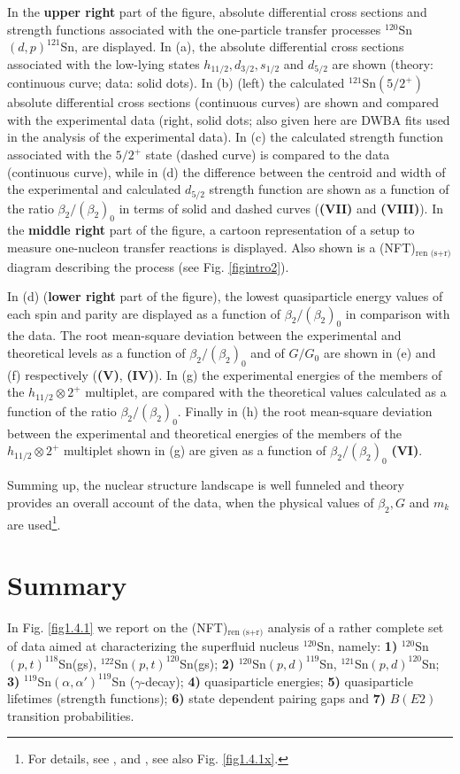    In the  \textbf{upper right} part of the figure, absolute differential cross sections and strength functions associated with the one-particle transfer processes $^{120}$Sn$(d,p)^{121}$Sn, are displayed. In  (a), the absolute differential cross sections associated with the low-lying  states $h_{11/2},d_{3/2},s_{1/2}$ and $d_{5/2}$ are shown (theory: continuous curve; data: solid dots). In (b) (left) the calculated $^{121}$Sn$(5/2^+)$ absolute differential cross sections (continuous curves) are shown and compared with the experimental data (right, solid dots; also given here are DWBA fits used in the analysis of the experimental data). In (c)  the calculated strength function associated with the $5/2^+$ state (dashed curve) is compared to the data (continuous curve), while in  (d) the difference between the centroid and  width of the experimental and calculated $d_{5/2}$ strength function  are shown as a function of the ratio $\beta_2/(\beta_2)_0$ in terms of  solid and dashed curves (\textbf{(VII)} and \textbf{(VIII)}).
    In the \textbf{middle right} part of the figure, a cartoon representation of a setup to measure one-nucleon transfer reactions is displayed. Also shown is a (NFT)$_{\text{ren (s+r)}}$ diagram  describing the process (see Fig. \ref{figintro2}).
    
    
      In (d)  (\textbf{lower right} part of the figure), the lowest quasiparticle energy values of each spin and parity are displayed as a function of $\beta_2/(\beta_2)_0$ in comparison with the data.  The root mean-square deviation between the experimental and theoretical levels as a function  of  $\beta_2/(\beta_2)_0$ and  of $G/G_0$ are shown in (e) and (f) respectively (\textbf{(V)}, \textbf{(IV)}). In (g) the  experimental energies of the members of the $h_{11/2}\otimes 2^+$  multiplet, are compared with the theoretical values calculated as a function of the ratio $\beta_2/(\beta_2)_0$. Finally in (h) the root mean-square deviation between the experimental and theoretical energies of the members of the $h_{11/2}\otimes 2^+$ multiplet shown in (g) are given as a function of $\beta_2/(\beta_2)_0$ \textbf{(VI)}. 
  
  
  Summing up, the nuclear structure landscape is well funneled and  theory provides an overall account of the data, when the physical values of $\beta_2,G$ and $m_k$ are used\footnote{For details, see \cite{Idini:15}, and \cite{Broglia:16}, see also  Fig. \ref{fig1.4.1x}.}.

\section{Summary}\label{C1S11}
In Fig. \ref{fig1.4.1} we report on the (NFT)$_{\text{ren (s+r)}}$ analysis of a rather complete set of data aimed at characterizing the superfluid nucleus $^{120}$Sn, namely: \textbf{1)} $^{120}$Sn$(p,t)^{118}$Sn(gs), $^{122}$Sn$(p,t)^{120}$Sn(gs); \textbf{2)} $^{120}$Sn$(p,d)^{119}$Sn, $^{121}$Sn$(p,d)^{120}$Sn; \textbf{3)} $^{119}$Sn$(\alpha,\alpha')^{119}$Sn ($\gamma$-decay); \textbf{4)} quasiparticle energies; \textbf{5)} quasiparticle lifetimes (strength functions); \textbf{6)} state dependent pairing gaps and \textbf{7)} $B(E2)$ transition probabilities.

